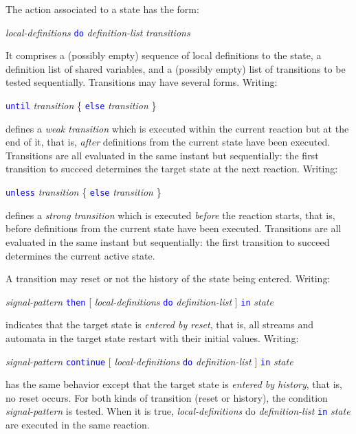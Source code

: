 \documentclass[11pt,titlepage,twoside]{report}
\newcommand{\Then}{\mbox{{\tt then}}}
\newcommand{\Until}{\mbox{\tt until}}
\newcommand{\Unless}{\mbox{\tt unless}}
\newcommand{\Continue}{\mbox{\tt continue}}
\newcommand{\Do}{\mbox{\tt do}}
\newcommand{\term}[1]{\textcolor{Blue}{\tt #1}}
\newcommand{\nterm}[1]{\textcolor{BrickRed}{\it #1}}
\newcommand{\term}[1]{{\tt #1}}
\newcommand{\nterm}[1]{{\em #1}}
\begin{document}
The action associated to a state has the form:
\begin{center}
  \nterm{local-definitions} \term{\Do} \nterm{definition-list} 
  \nterm{transitions}
\end{center}
It comprises a (possibly empty) sequence of local definitions to the
state, a definition list of shared variables, and a (possibly empty)
list of transitions to be tested sequentially. Transitions may
have several forms.  Writing:
\begin{center}
  \term{\Until} \nterm{transition} \{ \term{else} \nterm{transition} \}
  \end{center}
defines a {\em weak transition} which is executed within the current reaction
but at the end of it, that is, {\em after} definitions from the current state have
been executed. Transitions are all evaluated in the same instant but
sequentially: the first transition to succeed determines the target
state at the next reaction. Writing:
\begin{center}
  \term{\Unless} \nterm{transition} \{ \term{else} \nterm{transition} \}
\end{center}
defines a {\em strong transition} which is executed {\em before} the
reaction starts, that is, before definitions from the current state
have been executed. Transitions are all evaluated in the same instant
but sequentially: the first transition to succeed determines the
current active state.

A transition may reset or not the history of the state being entered.
Writing:
\begin{center}
  \nterm{signal-pattern} \term{\Then}
                  [ \nterm{local-definitions} \term{do} \nterm{definition-list} ]
                  \term{in} \nterm{state}
\end{center}
indicates that the target state is {\em entered by reset}, that is, all
streams and automata in the target state restart with their initial
values.
Writing:
\begin{center}
  \nterm{signal-pattern} \term{\Continue}
                  [ \nterm{local-definitions} \term{do} \nterm{definition-list} ]
                  \term{in} \nterm{state}
\end{center}
has the same behavior except that the target state is {\em entered by
  history}, that is, no reset occurs. For both kinds of transition
(reset or history), the condition \nterm{signal-pattern} is
tested. When it is true, \nterm{local-definitions} do
\nterm{definition-list} \term{in} \nterm{state} are executed in
the same reaction.
\end{document}
